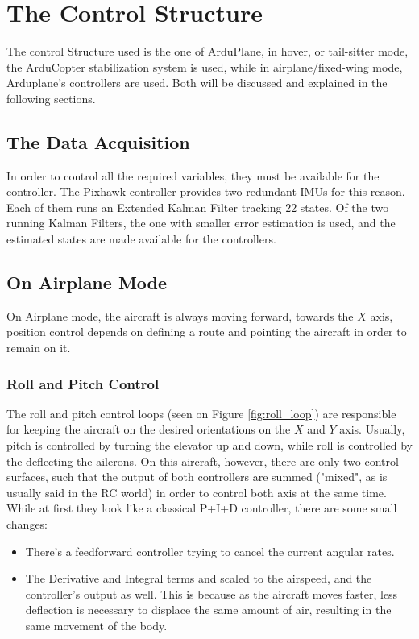 \chapter{The Control Structure} \label{chap:control}

The control Structure used is the one of ArduPlane, in hover, or tail-sitter mode, the ArduCopter stabilization system is used, while in airplane/fixed-wing mode, Arduplane's controllers are used. Both will be discussed and explained in the following sections.

\section{The Data Acquisition}

In order to control all the required variables, they must be available for the controller. The Pixhawk controller provides two redundant IMUs for this reason. Each of them runs an Extended Kalman Filter tracking 22 states\cite{kalman}\cite{kalmanArducopter}. Of the two running Kalman Filters, the one with smaller error estimation is used, and the estimated states are made available for the controllers.

\section{On Airplane Mode}

On Airplane mode, the aircraft is always moving forward, towards the $X$ axis, position control depends on defining a route and pointing the aircraft in order to remain on it.

\subsection{Roll and Pitch Control}

The roll and pitch control loops (seen on Figure \ref{fig:roll_loop}) are responsible for keeping the aircraft on the desired orientations on the $X$ and $Y$ axis. Usually, pitch is controlled by turning the elevator up and down, while roll is controlled by the deflecting the ailerons. On this aircraft, however, there are only two control surfaces, such that the output of both controllers are summed ("mixed", as is usually said in the RC world) in order to control both axis at the same time.
While at first they look like a classical P+I+D controller, there are some small changes:

\begin{itemize}
\item There's a feedforward controller trying to cancel the current angular rates.
\item The Derivative and Integral terms and scaled to the airspeed, and the controller's output as well. This is because  as the aircraft moves faster, less deflection is necessary to displace the same amount of air, resulting in the same movement of the body.
\end{itemize}


